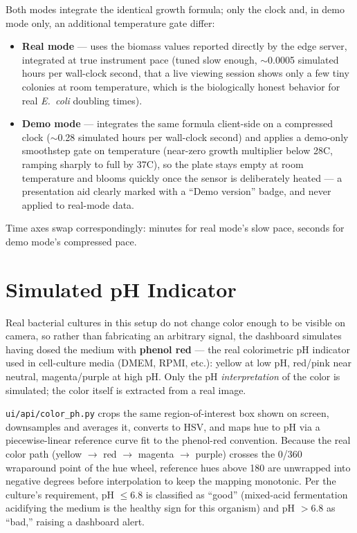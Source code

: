 \documentclass[11pt]{article}
\begin{document}
Both modes integrate the identical growth formula; only the clock and, in demo mode only, an additional temperature gate differ:

\begin{itemize}
    \item \textbf{Real mode} --- uses the biomass values reported directly by the edge server, integrated at true instrument pace (tuned slow enough, \(\sim\)0.0005 simulated hours per wall-clock second, that a live viewing session shows only a few tiny colonies at room temperature, which is the biologically honest behavior for real \emph{E.~coli} doubling times).
    \item \textbf{Demo mode} --- integrates the same formula client-side on a compressed clock (\(\sim\)0.28 simulated hours per wall-clock second) and applies a demo-only smoothstep gate on temperature (near-zero growth multiplier below 28\textdegree{}C, ramping sharply to full by 37\textdegree{}C), so the plate stays empty at room temperature and blooms quickly once the sensor is deliberately heated --- a presentation aid clearly marked with a ``Demo version'' badge, and never applied to real-mode data.
\end{itemize}

Time axes swap correspondingly: minutes for real mode's slow pace, seconds for demo mode's compressed pace.

\section{Simulated pH Indicator}

Real bacterial cultures in this setup do not change color enough to be visible on camera, so rather than fabricating an arbitrary signal, the dashboard simulates having dosed the medium with \textbf{phenol red} --- the real colorimetric pH indicator used in cell-culture media (DMEM, RPMI, etc.): yellow at low pH, red/pink near neutral, magenta/purple at high pH. Only the pH \emph{interpretation} of the color is simulated; the color itself is extracted from a real image.

\texttt{ui/api/color\_ph.py} crops the same region-of-interest box shown on screen, downsamples and averages it, converts to HSV, and maps hue to pH via a piecewise-linear reference curve fit to the phenol-red convention. Because the real color path (yellow $\rightarrow$ red $\rightarrow$ magenta $\rightarrow$ purple) crosses the 0\textdegree/360\textdegree{} wraparound point of the hue wheel, reference hues above 180\textdegree{} are unwrapped into negative degrees before interpolation to keep the mapping monotonic. Per the culture's requirement, pH $\le 6.8$ is classified as ``good'' (mixed-acid fermentation acidifying the medium is the healthy sign for this organism) and pH $> 6.8$ as ``bad,'' raising a dashboard alert.
\end{document}
